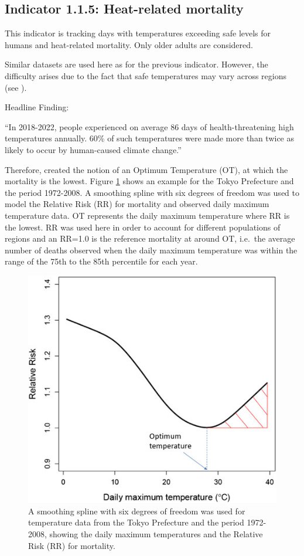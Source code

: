 \documentclass[
]{krantz}
\begin{document}
\subsection{Indicator 1.1.5: Heat-related mortality}\label{indicator-1.1.5-heat-related-mortality}

This indicator is tracking days with temperatures exceeding safe levels for humans and heat-related mortality. Only older adults are considered.

Similar datasets are used here as for the previous indicator. However, the difficulty arises due to the fact that safe temperatures may vary across regions (see \citet{honda2014}).

Headline Finding:

``In 2018-2022, people experienced on average 86 days of health-threatening high temperatures annually. 60\% of such temperatures were made more than twice as likely to occur by human-caused climate change.''

Therefore, \citet{honda2014} created the notion of an Optimum Temperature (OT), at which the mortality is the lowest. Figure \ref{fig:mortalityhondastrobl} shows an example for the Tokyo Prefecture and the period 1972-2008. A smoothing spline with six degrees of freedom was used to model the Relative Risk (RR) for mortality and observed daily maximum temperature data. OT represents the daily maximum temperature where RR is the lowest. RR was used here in order to account for different populations of regions and an RR=1.0 is the reference mortality at around OT, i.e.~the average number of deaths observed when the daily maximum temperature was within the range of the 75th to the 85th percentile for each year.

\begin{figure}

{\centering \includegraphics[width=0.5\linewidth]{work/08-lancet/figures/121_3} 

}

\caption{A smoothing spline with six degrees of freedom was used for temperature data from the Tokyo Prefecture and the period 1972-2008, showing the daily maximum temperatures and the Relative Risk (RR) for mortality.}\label{fig:mortalityhondastrobl}
\end{figure}
\end{document}
